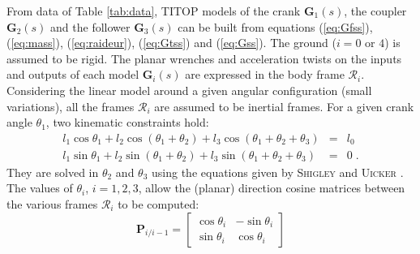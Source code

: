 From data of Table \ref{tab:data}, TITOP models of the crank $\mathbf{G}_1(s)$, the coupler  $\mathbf{G}_2(s)$ and the follower  $\mathbf{G}_3(s)$ can be built from equations (\ref{eq:Gfss}), (\ref{eq:mass}), (\ref{eq:raideur}), (\ref{eq:Gtss}) and (\ref{eq:Gss}).  The ground ($i=0$ or $4$) is assumed to be rigid. 
The planar wrenches and acceleration twists on the inputs and outputs of each model $\mathbf{G}_i(s)$ are expressed in the body frame $\mathcal{R}_i$.  Considering the linear model around a given angular configuration (small variations), all the frames $\mathcal{R}_i$ are assumed to be inertial frames. For a given crank angle $\theta_1$, two kinematic constraints hold:
\begin{eqnarray}\nonumber
l_1 \cos{\theta_1}+l_2 \cos{(\theta_1+\theta_2)}+l_3 \cos{(\theta_1+\theta_2+\theta_3)}&=&l_0 \\ \nonumber
l_1 \sin{\theta_1}+l_2 \sin{(\theta_1+\theta_2)}+l_3 \sin{(\theta_1+\theta_2+\theta_3)}&=&0\;.
\end{eqnarray}
They are solved in $\theta_2$ and $\theta_3$ using the equations given by \textsc{Shigley} and \textsc{Uicker} \cite{shigley1980}. The values of $\theta_i$, $i=1,2,3$, allow the (planar) direction cosine matrices between the various frames  $\mathcal{R}_i$ to be computed:
\[
\mathbf{P}_{i/i-1}=\left[\begin{array}{cc}\cos{\theta}_i & -\sin{\theta_i} \\ \sin{\theta_i} & \cos{\theta_i}\end{array}\right]
\]

